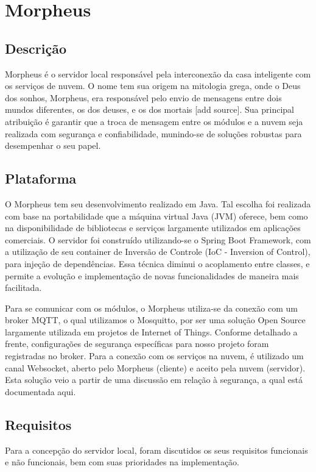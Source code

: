 \section{Morpheus}

\subsection{Descrição}
Morpheus é o servidor local responsável pela interconexão da casa inteligente com os serviços de nuvem. O nome tem sua origem na mitologia grega, onde o Deus dos sonhos, Morpheus, era responsável pelo envio de mensagens entre dois mundos diferentes, os dos deuses, e os dos mortais [add source]. Sua principal atribuição é garantir que a troca de mensagem entre os módulos e a nuvem seja realizada com segurança e confiabilidade, munindo-se de soluções robustas para desempenhar o seu papel.

\subsection{Plataforma}
O Morpheus tem seu desenvolvimento realizado em Java. Tal escolha foi realizada com base na portabilidade que a máquina virtual Java (JVM) oferece, bem como na disponibilidade de bibliotecas e serviços largamente utilizados em aplicações comerciais. O servidor foi construído utilizando-se o Spring Boot Framework, com a utilização de seu container de Inversão de Controle (IoC - Inversion of Control), para injeção de dependências. Essa técnica diminui o acoplamento entre classes, e permite a evolução e implementação de novas funcionalidades de maneira mais facilitada.

Para se comunicar com os módulos, o Morpheus utiliza-se da conexão com um broker MQTT, o qual utilizamos o Mosquitto, por ser uma solução Open Source largamente utilizada em projetos de Internet of Things. Conforme detalhado a frente, configurações de segurança específicas para nosso projeto foram registradas no broker. Para a conexão com os serviços na nuvem, é utilizado um canal Websocket, aberto pelo Morpheus (cliente) e aceito pela nuvem (servidor). Esta solução veio a partir de uma discussão em relação à segurança, a qual está documentada aqui.

\subsection{Requisitos}
Para a concepção do servidor local, foram discutidos os seus requisitos funcionais e não funcionais, bem com suas prioridades na implementação.


